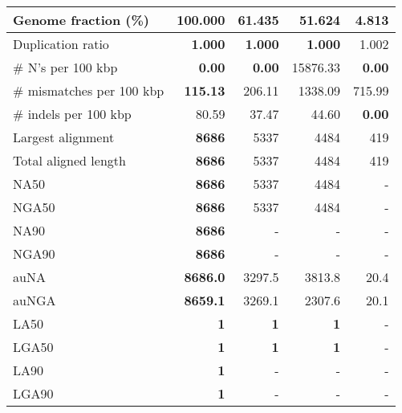 \documentclass[12pt,a4paper]{article}
\begin{document}
\begin{table}[ht]
\begin{center}
\begin{tabular}{|l*{4}{|r}|}
Genome fraction (\%) & {\bf 100.000} & 61.435 & 51.624 & 4.813 \\ \hline
Duplication ratio & {\bf 1.000} & {\bf 1.000} & {\bf 1.000} & 1.002 \\ \hline
\# N's per 100 kbp & {\bf 0.00} & {\bf 0.00} & 15876.33 & {\bf 0.00} \\ \hline
\# mismatches per 100 kbp & {\bf 115.13} & 206.11 & 1338.09 & 715.99 \\ \hline
\# indels per 100 kbp & 80.59 & 37.47 & 44.60 & {\bf 0.00} \\ \hline
Largest alignment & {\bf 8686} & 5337 & 4484 & 419 \\ \hline
Total aligned length & {\bf 8686} & 5337 & 4484 & 419 \\ \hline
NA50 & {\bf 8686} & 5337 & 4484 & - \\ \hline
NGA50 & {\bf 8686} & 5337 & 4484 & - \\ \hline
NA90 & {\bf 8686} & - & - & - \\ \hline
NGA90 & {\bf 8686} & - & - & - \\ \hline
auNA & {\bf 8686.0} & 3297.5 & 3813.8 & 20.4 \\ \hline
auNGA & {\bf 8659.1} & 3269.1 & 2307.6 & 20.1 \\ \hline
LA50 & {\bf 1} & {\bf 1} & {\bf 1} & - \\ \hline
LGA50 & {\bf 1} & {\bf 1} & {\bf 1} & - \\ \hline
LA90 & {\bf 1} & - & - & - \\ \hline
LGA90 & {\bf 1} & - & - & - \\ \hline
\end{tabular}
\end{center}
\end{table}
\end{document}

